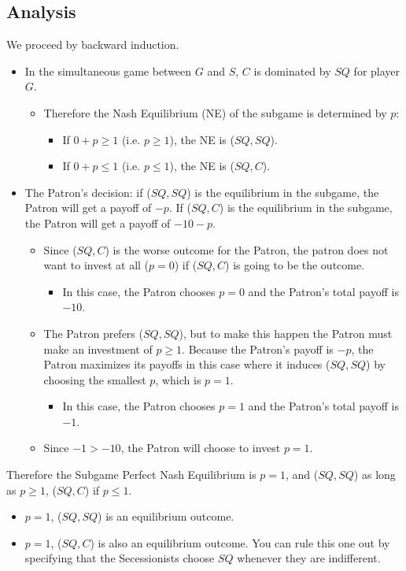 \documentclass[12pt]{article}
\begin{document}
\subsection{Analysis}
We proceed by backward induction.
\begin{itemize}
	\item In the simultaneous game between $G$ and $S$, $C$ is dominated by $SQ$ for player $G$.
		\begin{itemize}
			\item Therefore the Nash Equilibrium (NE) of the subgame is determined by $p$: 
				\begin{itemize}
					\item If $0+p \geq 1$ (i.e. $p \geq 1$), the NE is ($SQ,SQ$).
					\item If $0+p \leq 1$ (i.e. $p \leq 1$), the NE is ($SQ,C$).
				\end{itemize}
		\end{itemize}
	\item The Patron's decision: if ($SQ,SQ$) is the equilibrium in the subgame, the Patron will get a payoff of $-p$. If ($SQ,C$) is the equilibrium in the subgame, the Patron will get a payoff of $-10-p$.
		\begin{itemize}
			\item Since ($SQ,C$) is the worse outcome for the Patron, the patron does not want to invest at all ($p=0$) if ($SQ,C$) is going to be the outcome. 
				\begin{itemize}
					\item In this case, the Patron chooses $p=0$ and the Patron's total payoff is $-10$.
				\end{itemize}
			\item The Patron prefers ($SQ,SQ$), but to make this happen the Patron must make an investment of $p \geq 1$. Because the Patron's payoff is $-p$, the Patron maximizes its payoffs in this case where it induces ($SQ,SQ$) by choosing the smallest $p$, which is $p=1$. 
				\begin{itemize}
					\item In this case, the Patron chooses $p=1$ and the Patron's total payoff is $-1$.
				\end{itemize}
			\item Since $-1 > -10$, the Patron will choose to invest $p=1$.
		\end{itemize}
\end{itemize}
Therefore the Subgame Perfect Nash Equilibrium is $p=1$, and ($SQ,SQ$) as long as $p \geq 1$, ($SQ,C$) if $p \leq 1$.
\begin{itemize}
	\item $p=1$, ($SQ,SQ$) is an equilibrium outcome.
	\item $p=1$, ($SQ,C$) is also an equilibrium outcome. You can rule this one out by specifying that the Secessionists choose $SQ$ whenever they are indifferent.
\end{itemize}
\end{document}
